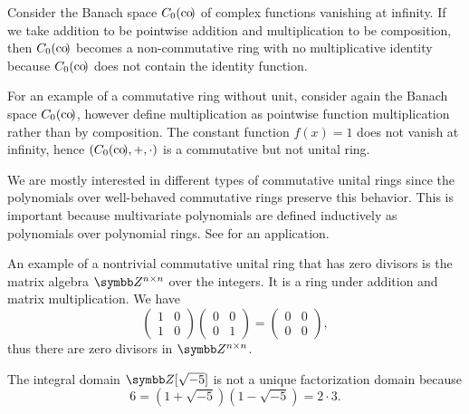 \begin{example}
\begin{description}
     Consider the Banach space \( C_0(\operatorname{co}\!) \) of complex functions vanishing at infinity. If we take addition to be pointwise addition and multiplication to be composition, then \( C_0(\operatorname{co}\!) \) becomes a non-commutative ring with no multiplicative identity because \( C_0(\operatorname{co}\!) \) does not contain the identity function.

     For an example of a commutative ring without unit, consider again the Banach space \( C_0(\operatorname{co}\!) \), however define multiplication as pointwise function multiplication rather than by composition. The constant function \( f(x) = 1 \) does not vanish at infinity, hence \( (C_0(\operatorname{co}\!), +, \cdot) \) is a commutative but not unital ring.

     We are mostly interested in different types of commutative unital rings since the polynomials over well-behaved commutative rings preserve this behavior. This is important because multivariate polynomials are defined inductively as polynomials over polynomial rings. See  for an application.

    An example of a nontrivial commutative unital ring that has zero divisors is the matrix algebra \( \BZ^{n \times n} \) over the integers. It is a ring under addition and matrix multiplication. We have
    \begin{equation*}
      \begin{pmatrix}
        1 & 0 \\
        1 & 0
      \end{pmatrix}
      \begin{pmatrix}
        0 & 0 \\
        0 & 1
      \end{pmatrix}
      =
      \begin{pmatrix}
        0 & 0 \\
        0 & 0
      \end{pmatrix},
    \end{equation*}
    thus there are zero divisors in \( \BZ^{n \times n} \).

    \cite[388]{Knapp2016BAlg} The integral domain \( \BZ[\sqrt{-5}] \) is not a unique factorization domain because
    \begin{equation*}
      6 = (1 + \sqrt{-5}) (1 - \sqrt{-5}) = 2 \cdot 3.
    \end{equation*}


\end{description}
\end{example}
